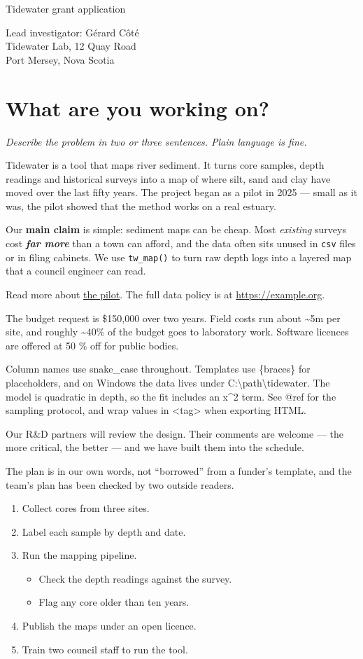 Tidewater grant application

Lead investigator: Gérard Côté\\
Tidewater Lab, 12 Quay Road\\
Port Mersey, Nova Scotia

\section{What are you working on?}

\emph{Describe the problem in two or three sentences. Plain language is fine.}

Tidewater is a tool that maps river sediment. It turns core samples, depth readings and historical surveys into a map of where silt, sand and clay have moved over the last fifty years. The project began as a pilot in 2025 — small as it was, the pilot showed that the method works on a real estuary.

Our \textbf{main claim} is simple: sediment maps can be cheap. Most \emph{existing} surveys cost \textbf{\emph{far more}} than a town can afford, and the data often sits unused in \texttt{csv} files or in filing cabinets. We use \texttt{tw\_map()} to turn raw depth logs into a layered map that a council engineer can read.

Read more about \href{https://example.org/pilot}{the pilot}. The full data policy is at \url{https://example.org}.

The budget request is \$150,000 over two years. Field costs run about \textasciitilde{}5m per site, and roughly \textasciitilde{}40\% of the budget goes to laboratory work. Software licences are offered at 50 \% off for public bodies.

Column names use snake\_case throughout. Templates use \{braces\} for placeholders, and on Windows the data lives under C:\textbackslash{}path\textbackslash{}tidewater. The model is quadratic in depth, so the fit includes an x\textasciicircum{}2 term. See @ref for the sampling protocol, and wrap values in <tag> when exporting HTML.

Our R\&D partners will review the design. Their comments are welcome — the more critical, the better — and we have built them into the schedule.

The plan is in our own words, not “borrowed” from a funder’s template, and the team’s plan has been checked by two outside readers.

\begin{enumerate}
  \item Collect cores from three sites.
  \item Label each sample by depth and date.
  \item Run the mapping pipeline.
  \begin{itemize}
    \item Check the depth readings against the survey.
    \item Flag any core older than ten years.
  \end{itemize}
  \item Publish the maps under an open licence.
  \item Train two council staff to run the tool.
\end{enumerate}

